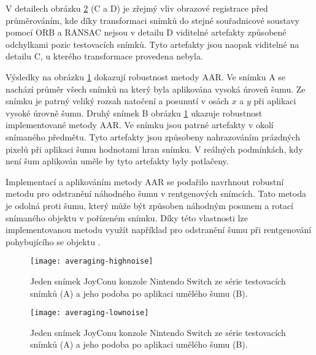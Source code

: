 V detailech obrázku \ref{fig:averaging-low-noise} (C a D) je zřejmý vliv obrazové registrace před průměrováním, kde díky transformaci snímků do stejné  souřadnicové soustavy pomocí ORB a RANSAC nejsou v detailu D viditelné artefakty způsobené odchylkami pozic testovacích snímků. Tyto artefakty jsou naopak viditelné na detailu C, u kterého transformace provedena nebyla.

Výsledky na obrázku \ref{fig:averaging-high-noise} dokazují robustnost metody AAR. Ve snímku A se nachází průměr všech snímků na který byla aplikována vysoká úroveň šumu. Ze snímku je patrný veliký rozsah natočení a posunutí v osách $x$ a $y$ při aplikaci vysoké úrovně šumu. Druhý snímek B obrázku \ref{fig:averaging-high-noise} ukazuje robustnost implementované metody AAR. Ve snímku jsou patrné artefakty v okolí snímaného předmětu. Tyto artefakty jsou způsobeny nahrazováním prázdných pixelů při aplikaci šumu hodnotami hran snímku. V reálných podmínkách, kdy není šum aplikován uměle by tyto artefakty byly potlačeny.

Implementací a aplikováním metody AAR se podařilo navrhnout robustní metodu pro odstranění náhodného šumu v rentgenových snímcích. Tato metoda je odolná proti šumu, který může být způsoben náhodným posunem a rotací snímaného objektu v pořízeném snímku. Díky této vlastnosti lze implementovanou metodu využít například pro odstranění šumu při rentgenování pohybujícího se objektu  .

\begin{figure}[htb]
\centering
\texttt{[image: averaging-highnoise]}
\caption{Jeden snímek JoyConu konzole Nintendo Switch ze série testovacích snímků (A) a jeho podoba po aplikaci umělého šumu (B).}
\label{fig:averaging-high-noise}
\end{figure}

\begin{figure}[htb]
\centering
\texttt{[image: averaging-lownoise]}
\caption{Jeden snímek JoyConu konzole Nintendo Switch ze série testovacích snímků (A) a jeho podoba po aplikaci umělého šumu (B).}
\label{fig:averaging-low-noise}
\end{figure}

